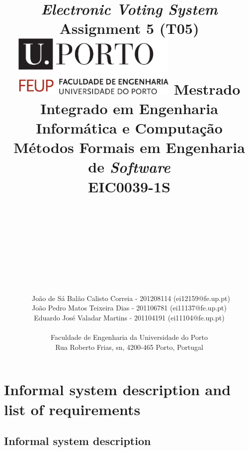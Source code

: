 \documentclass{article}
\begin{document}
\title{\Huge\textbf{\textit{Electronic Voting System}}\linebreak
\Large\textbf{\\Assignment 5 (T05)}\linebreak\linebreak\linebreak
\includegraphics[width=8cm]{feup.pdf}\linebreak \linebreak
\large{Mestrado Integrado em Engenharia Informática e Computação} \linebreak
\large{Métodos Formais em Engenharia de \textit{Software}  \\ EIC0039-1S}\linebreak
}
\author{\\\\\\\\\\\\\\\\\\\
João de Sá Balão Calisto Correia - 201208114 (ei12159@fe.up.pt)\\
João Pedro Matos Teixeira Dias - 201106781 (ei11137@fe.up.pt)\\
Eduardo José Valadar Martins  - 201104191 (ei11104@fe.up.pt)\\
\\ Faculdade de Engenharia da Universidade do Porto \\ Rua Roberto Frias, s\/n, 4200-465 Porto, Portugal
 \vspace{1cm}}

\maketitle
\newpage
\tableofcontents
\newpage
\section{Informal system description and list of requirements}
\subsection{Informal system description}
\end{document}
